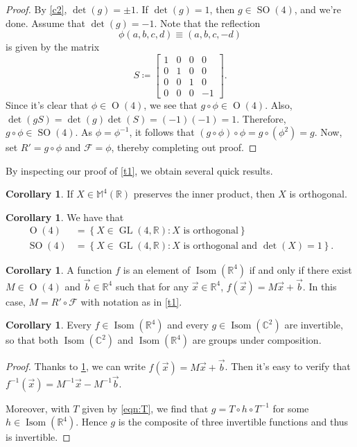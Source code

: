 \documentclass[10pt,letterpaper,cm]{nupset}
\theoremstyle{definition}
\theoremstyle{theorem}
\newtheorem{cor}[definition]{Corollary}
\theoremstyle{remark}
\newcommand{\C}{\mathbb C}
\newcommand{\F}{\mathcal F}
\newcommand{\M}{\mathbb M}
\newcommand{\R}{\mathbb R}
\newcommand{\1}{\mathbf{1}}
\renewcommand{\b}{\vec b}
\newcommand{\x}{\vec x}
\newcommand{\0}{\vec {0}}
\DeclareMathOperator{\ORT}{O}
\DeclareMathOperator{\Isom}{Isom}
\DeclareMathOperator{\SO}{SO}
\DeclareMathOperator{\GL}{GL}
\begin{document}
\begin{proof}
By \cref{c2}, $\det(g)=\pm 1$. If $\det(g)=1$, then $g\in \SO(4)$, and we're done. Assume that $\det(g)={-1}$. 
 Note that the reflection $$\phi(a,b,c,d)\equiv (a,b,c,-d)$$ is given by the matrix $$S\coloneqq\begin{bmatrix} 1 & 0 & 0 & 0 \\ 0&1&0&0\\ 0 & 0 &1 & 0 \\ 0 & 0 &0 &-1 \end{bmatrix}.$$ Since it's clear that $\phi \in \ORT(4)$, we see that $g\circ \phi\in \ORT(4)$. Also, $\det(gS)=\det(g)\det(S)=(-1)(-1)=1$. Therefore, $g\circ \phi \in \SO(4)$. As $\phi = \phi^{-1}$, it follows that $\left(g\circ \phi\right)\circ \phi= g\circ (\phi^2)=g$. Now, set $R'=g\circ \phi$ and $\F=\phi$, thereby completing out proof.


\end{proof}

By inspecting our proof of \cref{t1}, we obtain several quick results.

\begin{cor}\label{orth}
If $X\in \M^4(\R)$ preserves the inner product, then $X$ is orthogonal. 
\end{cor}

\begin{cor}
We have that
\begin{align*}
\ORT(4)&=\left\{X\in \GL(4, \R) : X \text{ is orthogonal}\right\}
\\ \SO(4)&=\left\{X\in \GL(4, \R) : X \text{ is orthogonal and }\det(X)=1\right\}.
\end{align*}
\end{cor}

\begin{cor}\label{af}
A function $f$ is an element of $\Isom(\R^4)$ if and only if there exist $M\in \ORT(4)$ and $\b \in \R^4$ such that for any $\x\in \R^4$, $f(\x)=M\x+\b$. In this case, $M=R'\circ \F$ with notation as in \cref{t1}.
\end{cor}

\begin{cor}\label{c12}
Every  $f\in \Isom(\R^4)$ and every $g\in \Isom(\C^2)$ are invertible, so that  both $\Isom(\C^2)$ and $\Isom(\R^4)$ are groups under composition. 
\end{cor}

\begin{proof}
Thanks to \cref{af}, we can write $f(\x)=M\x+\b$. Then it's easy to verify that $f^{-1}(\x)=M^{-1}\x-M^{-1}\b$.

Moreover, with $T$ given by \eqref{eqn:T}, we find that $g=T\circ h \circ T^{-1}$ for some $h\in \Isom(\R^4)$. Hence $g$ is the composite of three invertible functions and thus is invertible. 
\end{proof}
\end{document}
